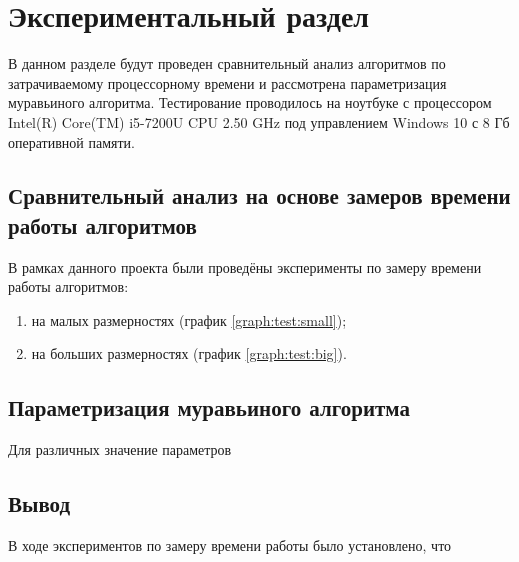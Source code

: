 \chapter{Экспериментальный раздел}
\label{cha:research}
    В данном разделе будут проведен  
    сравнительный анализ алгоритмов по затрачиваемому процессорному 
    времени и рассмотрена параметризация муравьиного алгоритма.
    Тестирование проводилось на ноутбуке с процессором
    Intel(R) Core(TM) i5-7200U CPU 2.50 GHz \cite{processor-i5-7200u}
    под управлением Windows 10 с 8 Гб оперативной памяти.

    \section{Сравнительный анализ на основе замеров времени работы алгоритмов}
        В рамках данного проекта были проведёны эксперименты
        по замеру времени работы алгоритмов:
        \begin{enumerate}
            \item на малых размерностях (график \ref{graph:test:small});
            \item на больших размерностях (график \ref{graph:test:big}).
        \end{enumerate}

    \section{Параметризация муравьиного алгоритма}
        Для различных значение параметров

    \section{Вывод}
        В ходе экспериментов по замеру времени работы было установлено, что 
        
\newpage